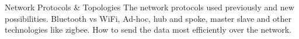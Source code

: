 Network Protocols & Topologies
The network protocols used previously and new possibilities. Bluetooth vs WiFi, Ad-hoc, hub and spoke, master slave and other technologies like zigbee. How to send the data most efficiently over the network.